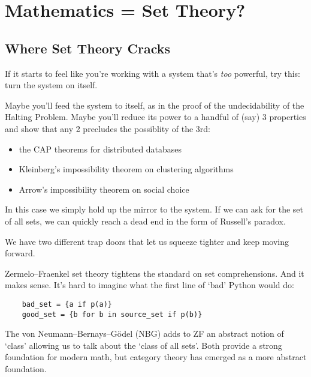 \chapter{Mathematics = Set Theory?}

\section{Where Set Theory Cracks}

If it starts to feel like you're working with a system that's \emph{too} powerful, try this: turn the system on itself.

Maybe you'll feed the system to itself, as in the proof of the undecidability of the Halting Problem. 
Maybe you'll reduce its power to a handful of (say) 3 properties and show that any 2 precludes the possiblity of the 3rd:
\begin{itemize}
  \item the CAP theorems for distributed databases
  \item Kleinberg's impossibility theorem on clustering algorithms
  \item Arrow's impossibility theorem on social choice
\end{itemize}

In this case we simply hold up the mirror to the system. If we can ask for the set of all sets, we can quickly reach a dead end in the form of Russell's paradox.

We have two different trap doors that let us squeeze tighter and keep moving forward.

Zermelo–Fraenkel set theory tightens the standard on set comprehensions. And it makes sense. It's hard to imagine what the first line of `bad' Python would do:
\begin{verbatim}
    bad_set = {a if p(a)}
    good_set = {b for b in source_set if p(b)}
\end{verbatim}

The von Neumann–Bernays–Gödel (NBG) adds to ZF an abstract notion of `class' allowing us to talk about the `class of all sets'. 
Both provide a strong foundation for modern math, but category theory has emerged as a more abstract foundation.
